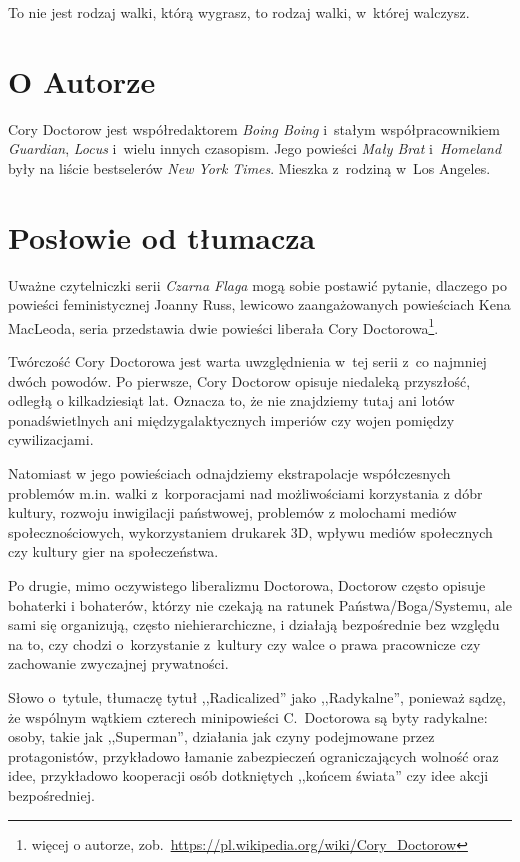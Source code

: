 \documentclass[oneside,polish,11pt,sfheadings]{mwbk}
\begin{document}
To nie jest rodzaj walki, którą wygrasz, to rodzaj walki, w~której walczysz.

\chapter*{O Autorze}

Cory Doctorow jest współredaktorem \textit{Boing Boing} i~stałym
współpracownikiem \textit{Guardian}, \textit{Locus} i~wielu innych
czasopism. Jego powieści \textit{Mały Brat} i~\textit{Homeland} były na
liście bestselerów \textit{New York Times}. Mieszka z~rodziną w~Los
Angeles.


\chapter*{Posłowie od tłumacza}

Uważne czytelniczki serii \textit{Czarna Flaga} mogą sobie postawić pytanie, dlaczego po powieści feministycznej Joanny Russ, lewicowo zaangażowanych powieściach Kena MacLeoda, seria przedstawia dwie powieści liberała Cory Doctorowa\footnote{więcej o autorze, zob.~\url{https://pl.wikipedia.org/wiki/Cory_Doctorow}}.

Twórczość Cory Doctorowa jest warta uwzględnienia w~tej serii z~co najmniej dwóch powodów. Po pierwsze, Cory Doctorow opisuje niedaleką przyszłość, odległą o kilkadziesiąt lat. Oznacza to, że nie znajdziemy tutaj ani lotów ponadświetlnych ani międzygalaktycznych imperiów czy wojen pomiędzy cywilizacjami. 

Natomiast w jego powieściach odnajdziemy ekstrapolacje współczesnych problemów m.in. walki z~korporacjami nad możliwościami korzystania z dóbr kultury, rozwoju inwigilacji państwowej, problemów z molochami mediów społecznościowych, wykorzystaniem drukarek 3D, wpływu mediów społecznych czy kultury gier na społeczeństwa.

Po drugie, mimo oczywistego liberalizmu Doctorowa, Doctorow często opisuje bohaterki i bohaterów, którzy nie czekają na ratunek Państwa/Boga/Systemu, ale sami się organizują, często niehierarchiczne, i działają bezpośrednie bez względu na to, czy chodzi o~korzystanie z~kultury czy walce o prawa pracownicze czy zachowanie zwyczajnej prywatności.

Słowo o~tytule, tłumaczę tytuł ,,Radicalized'' jako ,,Radykalne'', ponieważ sądzę, że wspólnym wątkiem czterech minipowieści C.~Doctorowa są byty radykalne: osoby, takie jak ,,Superman'', działania jak czyny podejmowane przez protagonistów, przykładowo łamanie zabezpieczeń ograniczających wolność oraz idee, przykładowo kooperacji osób dotkniętych ,,końcem świata'' czy idee akcji bezpośredniej.
\end{document}
